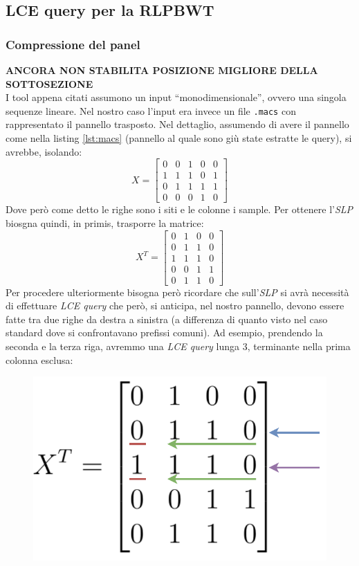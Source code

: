 \subsection{LCE query per la RLPBWT}





\subsubsection{Compressione del panel}
\textbf{ANCORA NON STABILITA POSIZIONE MIGLIORE DELLA SOTTOSEZIONE}\\
I tool appena citati assumono un input ``monodimensionale'', ovvero una singola
sequenze lineare. Nel nostro caso l'input era invece un file \texttt{.macs} con
rappresentato il pannello trasposto. Nel dettaglio, assumendo di avere il
pannello come nella listing \ref{lst:macs} (pannello al quale sono giù state
estratte le query), si avrebbe, isolando:
\[
  X=\left[
    \begin{matrix}
      0 & 0 & 1 & 0 & 0\\
      1 & 1 & 1 & 0 & 1\\
      0 & 1 & 1 & 1 & 1\\
      0 & 0 & 0 & 1 & 0
    \end{matrix}
  \right]
\]
Dove però come detto le righe sono i siti e le colonne i sample. Per ottenere
l'\textit{SLP} biosgna quindi, in primis, trasporre la matrice:
\[
  X^T=\left[
    \begin{matrix}
      0 & 1 & 0 & 0\\
      0 & 1 & 1 & 0\\
      1 & 1 & 1 & 0\\
      0 & 0 & 1 & 1\\
      0 & 1 & 1 & 0
    \end{matrix}
  \right]
\]
Per procedere ulteriormente bisogna però ricordare che sull'\textit{SLP} si avrà
necessità di effettuare \textit{LCE query} che però, si anticipa, nel nostro
pannello, devono essere fatte tra due righe da destra a sinistra (a differenza
di quanto visto nel caso standard dove si confrontavano prefissi comuni). Ad
esempio, prendendo la seconda e la terza riga, avremmo una \textit{LCE query}
lunga 3, terminante nella prima colonna esclusa:
\begin{figure}[H]
  \centering
  \includegraphics[scale = 0.38]{img/slppanel.pdf}
\end{figure}
